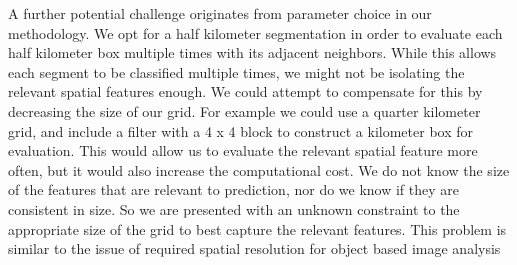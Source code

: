 A further potential challenge originates from parameter choice in our methodology.  We opt for a half kilometer segmentation in order to evaluate each half kilometer box multiple times with its adjacent neighbors.  While this allows each segment to be classified multiple times, we might not be isolating the relevant spatial features enough.  We could attempt to compensate for this by decreasing the size of our grid.  For example we could use a quarter kilometer grid, and include a filter with a 4 x 4 block to construct a kilometer box for evaluation.  This would allow us to evaluate the relevant spatial feature more often, but it would also increase the computational cost.  We do not know the size of the features that are relevant to prediction, nor do we know if they are consistent in size.  So we are presented with an unknown constraint to the appropriate size of the grid to best capture the relevant features.  This problem is similar to the issue of required spatial resolution for object based image analysis \citep{blaschke2010object}






